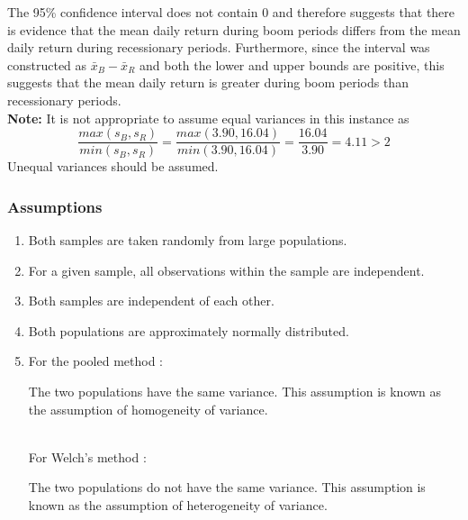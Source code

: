 \begin{example}
The 95\% confidence interval does not contain 0 and therefore suggests that there is evidence that the mean daily return during boom periods differs from the mean daily return during recessionary periods. Furthermore, since the interval was constructed as $\bar{x}_B - \bar{x}_R$ and both the lower and upper bounds are positive, this suggests that the mean daily return is greater during boom periods than recessionary periods. \\

\textbf{Note:} It is not appropriate to assume equal variances in this instance as 
\[ \frac{max(s_B, s_R)}{min(s_B, s_R)} = \frac{max(3.90, 16.04)}{min(3.90, 16.04)} = \frac{16.04}{3.90} = 4.11 > 2 \]
Unequal variances should be assumed. 


\end{example}


\subsubsection{Assumptions}

\begin{assumptions}
\begin{enumerate}
\item Both samples are taken randomly from large populations.			
\item For a given sample, all observations within the sample are independent.
\item Both samples are independent of each other.
\item Both populations are approximately normally distributed.		
\item For the pooled method	\tabto{4.25cm} : \begin{minipage}[t]{10.75cm}
								The two populations have the same variance. 
								This assumption is known as the assumption of 
								homogeneity of variance.\\
								\end{minipage}
	\hfill\\
        	For Welch's method		\tabto{4.25cm} : \begin{minipage}[t]{10.75cm}
								The two populations do not have the same variance.
								This assumption is known as the assumption of 
								heterogeneity of variance.
								\end{minipage}
\end{enumerate}
\end{assumptions}



